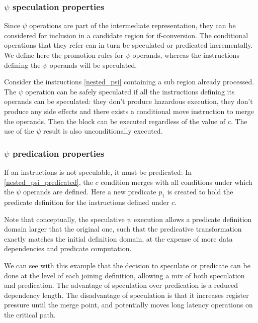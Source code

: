 \subsubsection{$\psi$ speculation properties}

Since $\psi$ operations are part of the intermediate representation, they can be considered for inclusion in a candidate region for if-conversion. The conditional operations that they refer can in turn be speculated or predicated incrementally. We define here the promotion rules for $\psi$ operands, whereas the instructions defining the $\psi$ operands will be speculated.

Consider the instructions \ref{nested_psi} containing a sub region already processed. The $\psi$ operation can be safely speculated if all the instructions defining its operands can be speculated: they don't produce hazardous execution, they don't produce any side effects and there exists a conditional move instruction to merge the operands. Then the block can be executed regardless of the value of $c$. The use of the $\psi$ result is also unconditionally executed.

\subsubsection{$\psi$ predication properties}

If an instructions is not speculable, it must be predicated:
In \ref{nested_psi_predicated}, the $c$ condition merges with all conditions under which the $\psi$ operands are defined. Here a new predicate $p_1$ is created to hold the predicate definition for the instructions defined under $c$. 

Note that conceptually, the speculative $\psi$ execution allows a predicate definition domain larger that the original one, such that the predicative transformation exactly matches the initial definition domain, at the expense of more data dependencies and predicate computation.

We can see with this example that the decision to speculate or predicate can be done at the level of each joining definition, allowing a mix of both speculation and predication. The advantage of speculation over predication is a reduced dependency length. The disadvantage of speculation is that it increases register pressure until the merge point, and potentially moves long latency operations on the critical path.
 
